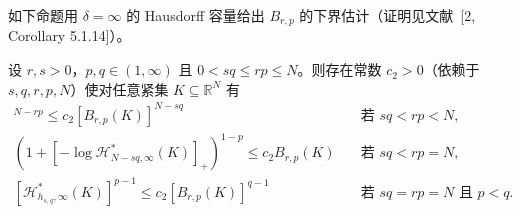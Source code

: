 \documentclass[../../main.tex]{subfiles}%
\begin{document}
如下命题用 $\delta=\infty$ 的 Hausdorff 容量给出 $B_{r,p}$ 的下界估计（证明见文献~[2, Corollary 5.1.14]）。

\begin{proposition}\label{proposition:ch03-BesselHausdorff下界}
设 $r,s>0$，$p,q\in(1,\infty)$ 且 $0<sq\leqslant rp\leqslant N$。则存在常数 $c_2>0$（依赖于 $s,q,r,p,N$）使对任意紧集 $K\subseteq\mathbb{R}^N$ 有
\begin{align}
[\mathcal{H}^*_{N-sq,\infty}(K)]^{N-rp}\leqslant c_2[B_{r,p}(K)]^{N-sq}
&\quad\text{若 }sq<rp<N,\label{align:ch03-3.67a}\\
(1+[-\log\mathcal{H}^*_{N-sq,\infty}(K)]_+)^{1-p}\leqslant c_2B_{r,p}(K)
&\quad\text{若 }sq<rp=N,\label{align:ch03-3.67b}\\
[\mathcal{H}^*_{h_{s,q},\infty}(K)]^{p-1}\leqslant c_2[B_{r,p}(K)]^{q-1}
&\quad\text{若 }sq=rp=N\text{ 且 }p<q.\label{align:ch03-3.67c}
\end{align}
\end{proposition}
\end{document}
